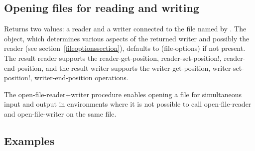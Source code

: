 \subsection{Opening files for reading and writing}

\begin{entry}{%
}
   
Returns two values: a reader and a writer connected to the file
named by . The  object, which determines various aspects of
the returned writer and possibly the reader (see
section~\ref{fileoptionssection}), defaults to
{\cf (file-options)} if not present. The result reader supports
the {\cf reader-get-position}, {\cf reader-set-position!}, {\cf
  reader-end-position}, and the result writer supports the {\cf writer-get-position}, {\cf
  writer-set-position!}, {\cf writer-end-position} operations.

\begin{note}
  The {\cf open-file-reader+writer} procedure enables opening 
  a file for simultaneous input and
  output in environments where it is not possible to call
  {\cf open-file-reader} and {\cf open-file-writer} on the same file.
\end{note}     
\end{entry}

\subsection{Examples}

